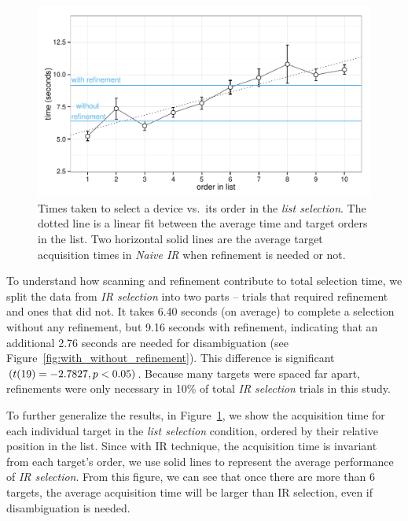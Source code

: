 \begin{figure}[t]
\centering
\includegraphics[width=0.95\columnwidth]{figures/result_study1c.pdf}
\caption{Times taken to select a device vs.~its order in the {\em list selection}. The dotted line is a linear fit between the average time and target orders in the list. Two horizontal solid lines are the average target acquisition times in {\em Naive IR} when refinement is needed or not.}
\label{fig:time-vs-list-order}
\end{figure}

To understand how scanning and refinement contribute to total selection time, we split the data from {\em IR selection} into two parts -- trials that required refinement and ones that did not. It takes 6.40 seconds (on average) to complete  a selection without any refinement, but 9.16 seconds with refinement, indicating that an additional 2.76 seconds are needed for disambiguation (see Figure~\ref{fig:with_without_refinement}). This difference is significant $(t(19)=-2.7827, {p<0.05})$.%
Because many targets were spaced far apart, refinements were only necessary in 10\% of total {\em IR selection} trials in this study.

To further generalize the results, in Figure~\ref{fig:time-vs-list-order}, we show the acquisition time for each individual target in the {\em list selection} condition, ordered by their relative position in the list. Since with IR technique, the acquisition time is invariant from each target's order, we use solid lines to represent the average performance of {\em IR selection}. From this figure, we can see that once there are more than 6 targets, the average acquisition time will be larger than IR selection, even if disambiguation is needed. %

